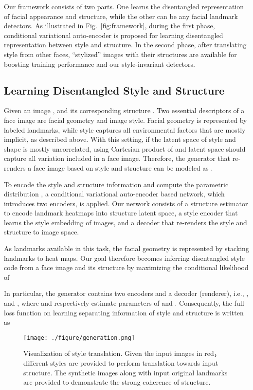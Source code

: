 \documentclass[10pt,twocolumn,letterpaper]{article}
\begin{document}
Our framework consists of two parts. One learns the disentangled representation of facial appearance and structure, while the other can be any facial landmark detectors. As illustrated in Fig.~\ref{fig:framework}, during the first phase, conditional variational auto-encoder is proposed for learning disentangled representation between style and structure. In the second phase, after translating style from other faces, ``stylized'' images with their structures are available for boosting training performance and our style-invariant detectors. 

\subsection{Learning Disentangled Style and Structure }

Given an image , and its corresponding structure . Two essential descriptors of a face image are facial geometry and image style. Facial geometry is represented by labeled landmarks, while style captures all environmental factors that are mostly implicit, as described above. With this setting, if the latent space of style and shape is mostly uncorrelated, using Cartesian product of  and  latent space should capture all variation included in a face image. Therefore, the generator that re-renders a face image based on style and structure can be modeled as . 

To encode the style and structure information and compute the parametric distribution , a conditional variational auto-encoder based network, which introduces two encoders, is applied. Our network consists of a structure estimator  to encode landmark heatmaps into structure latent space, a style encoder  that learns the style embedding of images, and a decoder that re-renders the style and structure to image space. 

As landmarks available in this task, the facial geometry is represented by stacking landmarks to heat maps. Our goal therefore becomes inferring disentangled style code  from a face image and its structure by maximizing the conditional likelihood of

In particular, the generator  contains two encoders and a decoder (renderer), i.e., ,  and , where  and  respectively estimate parameters of  and . Consequently, the full loss function on learning separating information of style and structure is written as


\begin{figure*}[t!]
	\begin{center}
		\texttt{[image: ./figure/generation.png]}
	\end{center}
	\vspace{-0.3cm}
	\caption{{Visualization of style translation. Given the input images in red，  different styles are provided to perform translation towards input structure. The synthetic images along with input original landmarks are provided to demonstrate the strong coherence of structure. }}
	\vspace{-0.2cm}
	\label{fig:generation}
\end{figure*}
\end{document}
